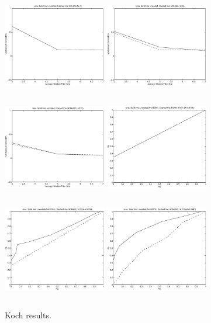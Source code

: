 \documentclass[12pt]{article}
\begin{document}
\begin{figure}[p]
        \includegraphics[height=4.5cm,width=4.5cm]{plot21.eps}
        \includegraphics[height=4.5cm,width=4.5cm]{plot25.eps}
        \includegraphics[height=4.5cm,width=4.5cm]{plot29.eps}
        \includegraphics[height=4.5cm,width=4.5cm]{plot22.eps}
        \includegraphics[height=4.5cm,width=4.5cm]{plot26.eps}
        \includegraphics[height=4.5cm,width=4.5cm]{plot30.eps}
        \caption{Koch results.}
\end{figure}
\end{document}
